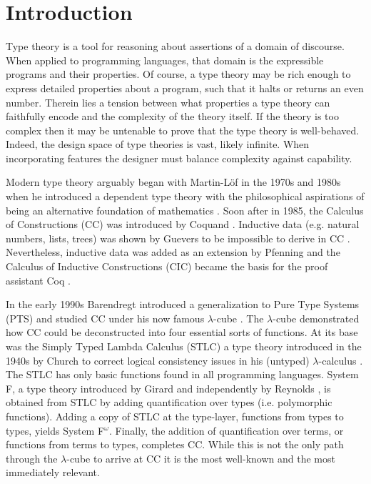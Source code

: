 \chapter{Introduction}



Type theory is a tool for reasoning about assertions of a domain of discourse.
When applied to programming languages, that domain is the expressible programs and their properties.
Of course, a type theory may be rich enough to express detailed properties about a program, such that it halts or returns an even number.
Therein lies a tension between what properties a type theory can faithfully encode and the complexity of the theory itself.
If the theory is too complex then it may be untenable to prove that the type theory is well-behaved.
Indeed, the design space of type theories is vast, likely infinite.
When incorporating features the designer must balance complexity against capability.

Modern type theory arguably began with Martin-L\"{o}f in the 1970s and 1980s when he introduced a dependent type theory with the philosophical aspirations of being an alternative foundation of mathematics \cite{lof1975,lof1984}.
Soon after in 1985, the Calculus of Constructions (CC) was introduced by Coquand \cite{coquand1985,coquand1986}.
Inductive data (e.g. natural numbers, lists, trees) was shown by Guevers to be impossible to derive in CC \cite{geuvers2001_noind}.
Nevertheless, inductive data was added as an extension by Pfenning \cite{pfenning1989} and the Calculus of Inductive Constructions (CIC) became the basis for the proof assistant Coq \cite{paulin-mohring1993}.

In the early 1990s Barendregt introduced a generalization to Pure Type Systems (PTS) and studied CC under his now famous $\lambda$-cube \cite{barendregt1990_cube,barendregt1991_pts}.
The $\lambda$-cube demonstrated how CC could be deconstructed into four essential sorts of functions.
At its base was the Simply Typed Lambda Calculus (STLC) a type theory introduced in the 1940s by Church to correct logical consistency issues in his (untyped) $\lambda$-calculus \cite{church1940_stlc}.
The STLC has only basic functions found in all programming languages.
System F, a type theory introduced by Girard \cite{girard1972,girard1989} and independently by Reynolds \cite{reynolds1974_systemf}, is obtained from STLC by adding quantification over types (i.e. polymorphic functions).
Adding a copy of STLC at the type-layer, functions from types to types, yields System F$^\omega$.
Finally, the addition of quantification over terms, or functions from terms to types, completes CC.
While this is not the only path through the $\lambda$-cube to arrive at CC it is the most well-known and the most immediately relevant.


